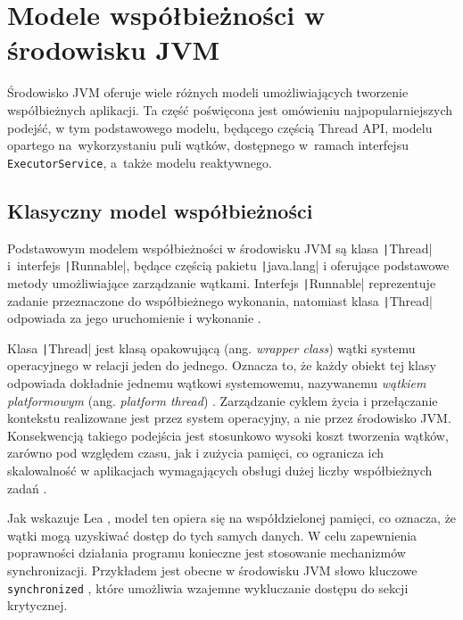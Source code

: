 \section{Modele współbieżności w środowisku JVM}

Środowisko JVM oferuje wiele różnych modeli umożliwiających tworzenie współbieżnych aplikacji. Ta część poświęcona jest omówieniu najpopularniejszych podejść, w tym podstawowego modelu, będącego częścią Thread API, modelu opartego na~wykorzystaniu puli wątków, dostępnego w~ramach interfejsu \texttt{ExecutorService}, a~także modelu reaktywnego.

\subsection{Klasyczny model współbieżności}
\label{sec:thread-api}


Podstawowym modelem współbieżności w środowisku JVM są klasa \texttt|Thread| i~interfejs \texttt|Runnable|, będące częścią pakietu \texttt|java.lang| i oferujące podstawowe metody umożliwiające zarządzanie wątkami. Interfejs \texttt|Runnable| reprezentuje zadanie przeznaczone do współbieżnego wykonania, natomiast klasa \texttt|Thread| odpowiada za jego uruchomienie i wykonanie \cite{java-thread, java-runnable}.

Klasa \texttt|Thread| jest klasą opakowującą (ang. \emph{wrapper class}) wątki systemu operacyjnego w relacji jeden do jednego. Oznacza to, że każdy obiekt tej klasy odpowiada dokładnie jednemu wątkowi systemowemu, nazywanemu \emph{wątkiem platformowym} (ang. \emph{platform thread}) \cite{friesen2015}. Zarządzanie cyklem życia i przełączanie kontekstu realizowane jest przez system operacyjny, a nie przez środowisko JVM. Konsekwencją takiego podejścia jest stosunkowo wysoki koszt tworzenia wątków, zarówno pod względem czasu, jak i zużycia pamięci, co ogranicza ich skalowalność w aplikacjach wymagających obsługi dużej liczby współbieżnych zadań \cite{veen2024}.

Jak wskazuje Lea \cite{lea1999}, model ten opiera się na współdzielonej pamięci, co oznacza, że wątki mogą uzyskiwać dostęp do tych samych danych. W celu zapewnienia poprawności działania programu konieczne jest stosowanie mechanizmów synchronizacji. Przykładem jest obecne w środowisku JVM słowo kluczowe \texttt{synchronized} \cite{java-synchronized}, które umożliwia wzajemne wykluczanie dostępu do sekcji krytycznej.

